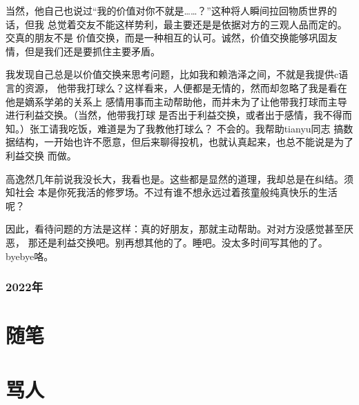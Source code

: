 \documentclass{ctexart}
\begin{document}
    当然，他自己也说过“我的价值对你不就是……？”这种将人瞬间拉回物质世界的话，但我
    总觉着交友不能这样势利，最主要还是是依据对方的三观人品而定的。交真的朋友不是
    价值交换，而是一种相互的认可。诚然，价值交换能够巩固友情，但是我们还是要抓住主要矛盾。

    我发现自己总是以价值交换来思考问题，比如我和赖浩泽之间，不就是我提供c语言的资源，
    他带我打球么？这样看来，人便都是无情的，然而却忽略了我是看在他是嫡系学弟的关系上
    感情用事而主动帮助他，而并未为了让他带我打球而主导进行利益交换。（当然，他带我打球
    是否出于利益交换，或者出于感情，我不得而知。）张工请我吃饭，难道是为了我教他打球么？
    不会的。我帮助tianyu同志
    搞数据结构，一开始也许不愿意，但后来聊得投机，也就认真起来，也总不能说是为了利益交换
    而做。

    高逸然几年前说我没长大，我看也是。这些都是显然的道理，我却总是在纠结。须知社会
    本是你死我活的修罗场。不过有谁不想永远过着孩童般纯真快乐的生活呢？

    因此，看待问题的方法是这样：真的好朋友，那就主动帮助。对对方没感觉甚至厌恶，
    那还是利益交换吧。别再想其他的了。睡吧。没太多时间写其他的了。byebye咯。
    \section{2022年}

    \part{随笔}
    \part{骂人}
\end{document}
